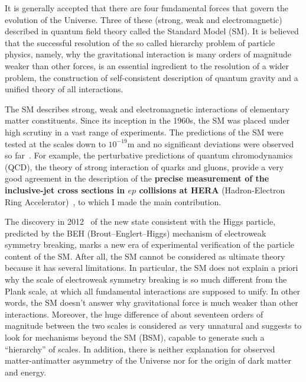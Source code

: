 \textcolor{\mycolor}{
It is generally accepted that there are four fundamental forces that govern the evolution of the Universe. \textcolor{\mynew}{Three of these (strong, weak and electromagnetic) described in quantum field theory called the Standard Model (SM).} It is believed that the successful resolution of the so called hierarchy problem of particle physics, namely, why the gravitational interaction is many orders of magnitude weaker than other forces, is an essential ingredient to the resolution of a wider problem, the construction of self-consistent description of quantum gravity and a unified theory of all interactions.}

\textcolor{\mycolor}{
The SM describes strong, weak and electromagnetic interactions of elementary matter constituents. Since its inception in the 1960s, the SM was placed under high scrutiny in a vast range of experiments. The predictions of the SM were tested at the scales down to $10^{-19}$m and no significant deviations were observed so far~\cite{Agashe:2014kda}. For example, the perturbative predictions of quantum chromodynamics (QCD), the theory of strong interaction of quarks and gluons, provide a very good agreement in the description of the \textbf{precise measurement of the inclusive-jet cross sections in $ep$ collisions at HERA} (Hadron-Electron Ring Accelerator)~\cite{Abramowicz:2012jz}, to which I made the main contribution.}

\textcolor{\mycolor}{
The discovery in 2012~\cite{Aad:2012tfa,Chatrchyan:2012xdj} of the new state consistent with the Higgs particle, predicted by the BEH (Brout--Englert--Higgs) mechanism of electroweak symmetry breaking, marks a new era of experimental verification of the particle content of the SM. After all, the SM cannot be considered as ultimate theory because it has several limitations. In particular, the SM does not explain a priori why the scale of electroweak symmetry breaking is so much different from the Plank scale, at which all fundamental interactions are supposed to unify. In other words, the SM doesn't answer why gravitational force is much weaker than other interactions. Moreover, the huge difference of about seventeen orders of magnitude between the two scales is considered as very unnatural and suggests to look for mechanisms beyond the SM (BSM), capable to generate such a ``hierarchy'' of scales. In addition, there is neither explanation for observed matter-antimatter asymmetry of the Universe nor for the origin of dark matter and energy.}

